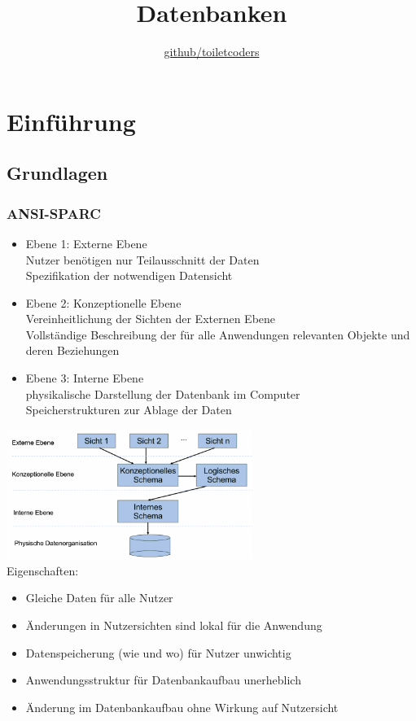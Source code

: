 \documentclass{scrreprt}
\title{\textbf{Datenbanken}}
\author{\href{https://github.com/toiletcoders}{\color{black}github/toiletcoders}}
\date{}
\begin{document}
\maketitle
\pagebreak
\renewcommand{\contentsname}{Inhaltsverzeichnis}
\setcounter{tocdepth}{1}
\tableofcontents
{}
\pagebreak
{}
\chapter{Einführung}
\section{Grundlagen}
\subsection{ANSI-SPARC}
\begin{itemize}
  \item Ebene 1: Externe Ebene
  \\Nutzer benötigen nur Teilausschnitt der Daten
  \\Spezifikation der notwendigen Datensicht
  \item Ebene 2: Konzeptionelle Ebene 
  \\Vereinheitlichung der Sichten der Externen Ebene 
  \\Vollständige Beschreibung der für alle Anwendungen relevanten Objekte und deren Beziehungen
  \item Ebene 3: Interne Ebene
  \\physikalische Darstellung der Datenbank im Computer
  \\Speicherstrukturen zur Ablage der Daten
\end{itemize}
\includegraphics[width=0.6\textwidth]{"graphics/ANSI-SPARC"}
\\Eigenschaften:
\begin{itemize}
  \item Gleiche Daten für alle Nutzer
  \item Änderungen in Nutzersichten sind lokal für die Anwendung
  \item Datenspeicherung (wie und wo) für Nutzer unwichtig
  \item Anwendungsstruktur für Datenbankaufbau unerheblich
  \item Änderung im Datenbankaufbau ohne Wirkung auf Nutzersicht
\end{itemize}
\end{document}
